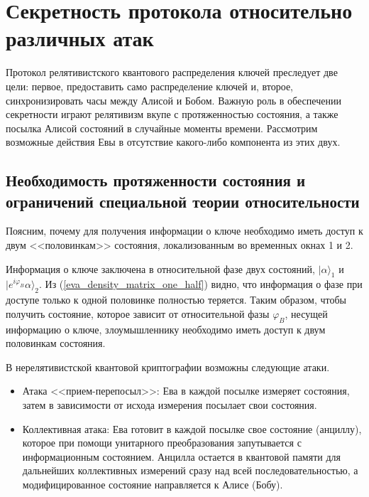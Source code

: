 \section{Секретность протокола относительно различных атак}
Протокол релятивистского квантового распределения ключей преследует две цели: первое, предоставить само распределение ключей и, второе, синхронизировать часы между Алисой и Бобом.
Важную роль в обеспечении секретности играют релятивизм вкупе с протяженностью состояния, а также посылка Алисой состояний в случайные моменты времени.
Рассмотрим возможные действия Евы в отсутствие какого-либо компонента из этих двух.

\subsection{Необходимость протяженности состояния и ограничений специальной теории относительности}
Поясним, почему для получения информации о ключе необходимо иметь доступ к двум <<половинкам>> состояния, локализованным во временных окнах 1 и 2.

Информация о ключе заключена в относительной фазе двух состояний, $|\alpha\rangle_1$ и $|e^{i\varphi_B}\alpha\rangle_2$.
Из (\ref{eva_density_matrix_one_half}) видно, что информация о фазе при доступе только к одной половинке полностью теряется.
Таким образом, чтобы получить состояние, которое зависит от относительной фазы $\varphi_B$, несущей информацию о ключе, злоумышленнику необходимо иметь доступ к двум половинкам состояния.

\begin{comment}
\begin{eqnarray}\label{eva_density_matrix_full}
    \rho(\varphi_B) = \int^{2\pi}_0 
{
\frac{d\theta}{2\pi} 
|\sqrt{\mu} e^{i(\varphi_{B} + \theta)} \rangle_1 ~ 
{}_1 \langle \sqrt{\mu}e^{-i(\varphi_{B} + \theta)} |
\otimes
|\sqrt{\mu} e^{i\theta} \rangle_2 ~ 
{}_2 \langle \sqrt{\mu}e^{-i\theta} |
} =  \nonumber\\
e^{-2\mu} \sum^\infty_{n,k,n',k'=0} 
{
  e^{i\varphi_B(n-n')}
  \frac
    {\mu^{\frac{n+k-n'-k'}{2}}}
    {\sqrt{n!k!n'!k'!}} 
  |k\rangle_1 
  \otimes
  |n\rangle_2 ~{}_2 \langle n' | 
  \otimes
  ~{}_1 \langle k' | \delta_{n+k,n'+k'}.
}
\end{eqnarray}

Таким образом, для получения информации о ключе необходим доступ к двум половинкам состояния.
\end{comment}

В нерелятивистской квантовой криптографии возможны следующие атаки.
\begin{itemize}
  \item Атака <<прием-перепосыл>>: Ева в каждой посылке измеряет состояния, затем в зависимости от исхода измерения посылает свои состояния.
  \item Коллективная атака: Ева готовит в каждой посылке свое состояние (анциллу), которое при помощи унитарного преобразования запутывается с информационным состоянием.
  Анцилла остается в квантовой памяти для дальнейших коллективных измерений сразу над всей последовательностью, а модифицированное состояние направляется к Алисе (Бобу).
\end{itemize}

